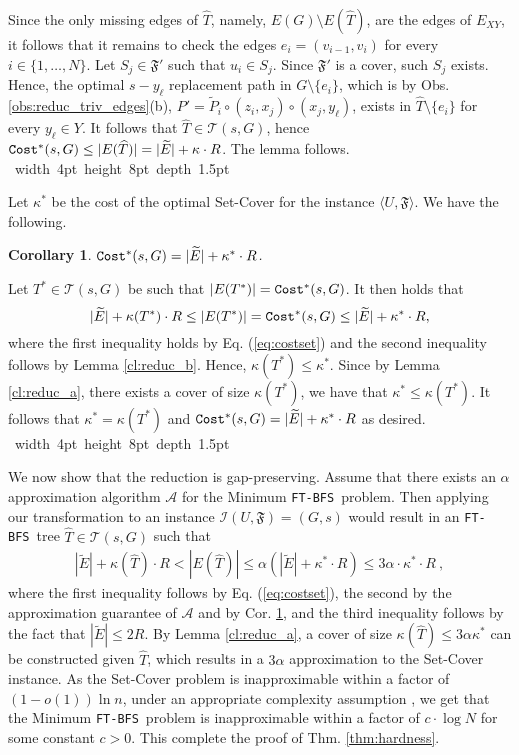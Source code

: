 \documentclass[12pt]{article}
\newtheorem{corollary}[theorem]{Corollary}
\def\Set{\mathfrak{F}}
\def\Cost{\mbox{\tt Cost}}
\def\Proof{\par\noindent{\bf Proof:~}}
\def\blackslug{\hbox{\hskip 1pt \vrule width 4pt height 8pt
    depth 1.5pt \hskip 1pt}}
\def\QED{\quad\blackslug\lower 8.5pt\null\par}
\def\FTBFS{\mbox{\tt FT-BFS}}
\begin{document}
\par Since the only missing edges of $\widehat{T}$, namely, $E(G)\setminus E(\widehat{T})$, are the edges of $E_{XY}$, it follows that
it remains to check the edges $e_i=(v_{i-1}, v_i)$ for every $i \in \{1, \ldots, N\}$. Let $S_j \in \Set'$ such that $u_i \in S_j$. Since $\Set'$ is a cover, such $S_j$ exists. Hence, the optimal $s-y_\ell$ replacement path in
$G\setminus \{e_i\}$, which is by Obs. \ref{obs:reduc_triv_edges}(b), $P'=\widetilde{P}_i \circ (z_i,x_j) \circ (x_j,y_\ell)$, exists in $\widehat{T} \setminus \{e_i\}$ for every $y_\ell \in Y$.
It follows that $\widehat{T} \in \mathcal{T}(s,G)$, hence $\Cost^*(s, G) \leq |E(\widehat{T})|=|\widetilde{E}|+\kappa \cdot R$. The lemma follows.
\QED
Let $\kappa^*$ be the cost of the optimal Set-Cover for the instance $\langle U, \Set \rangle$. We have the following.
\begin{corollary}
\label{cor:reduc_opt}
$\Cost^*(s,G)=|\widetilde{E}|+\kappa^* \cdot R$.
\end{corollary}
\Proof
Let $T^* \in \mathcal{T}(s,G)$ be such that $|E(T^*)|=\Cost^*(s,G)$.
It then holds that
$$|\widetilde{E}|+\kappa(T^*) \cdot R \leq |E(T^*)|=\Cost^*(s,G)\leq |\widetilde{E}|+\kappa^* \cdot R,$$
where the first inequality holds by Eq. (\ref{eq:costset}) and the second inequality follows by Lemma \ref{cl:reduc_b}. Hence, $\kappa(T^*) \leq \kappa^*$.
Since by Lemma \ref{cl:reduc_a},
there exists a cover of size $\kappa(T^*)$, we have that  $\kappa^*\leq \kappa(T^*)$.
It follows that $\kappa^*=\kappa(T^*)$ and $\Cost^*(s,G)=|\widetilde{E}|+\kappa^* \cdot R$ as desired.
\QED
We now show that the reduction is gap-preserving.
Assume that there exists an $\alpha$ approximation algorithm $\mathcal{A}$ for the Minimum \FTBFS\ problem. Then applying our transformation to an instance $\mathcal{I}(U, \Set)=(G,s)$ would result in an \FTBFS\ tree $\widehat{T} \in \mathcal{T}(s,G)$ such that
\begin{eqnarray*}
|\widetilde{E}|+\kappa(\widehat{T})\cdot R < |E(\widehat{T})| \leq \alpha(|\widetilde{E}|+\kappa^* \cdot R)\leq 3\alpha \cdot \kappa^* \cdot R~,
\end{eqnarray*}
where the first inequality follows by Eq. (\ref{eq:costset}), the second by the approximation guarantee of $\mathcal{A}$ and by Cor. \ref{cor:reduc_opt}, and the third inequality follows by the fact that $|\widetilde{E}| \leq 2R$.
By Lemma \ref{cl:reduc_a}, a cover of size $\kappa(\widehat{T}) \leq 3\alpha \kappa^*$ can be constructed given $\widehat{T}$, which results in a $3\alpha$ approximation to the Set-Cover instance. As the Set-Cover problem is inapproximable within a factor of $(1-o(1)) \ln n$, under an appropriate complexity assumption \cite{Feige98}, we get that the Minimum \FTBFS\ problem is inapproximable within a factor of $c \cdot \log N$ for some constant $c>0$.
This complete the proof of Thm. \ref{thm:hardness}.
\end{document}
